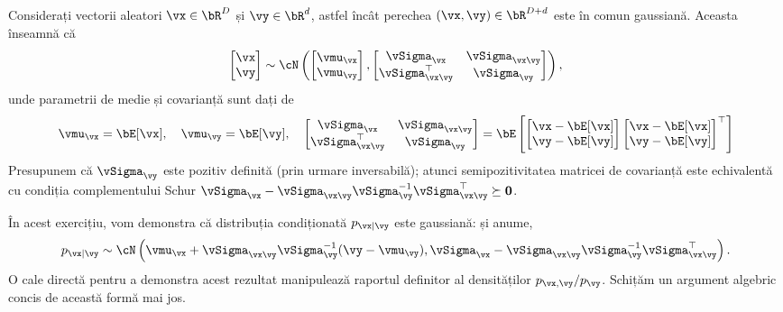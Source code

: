 \documentclass[../../book-main_ro.tex]{subfiles}
\begin{document}
\begin{exercise}\label{exercise:conditional_gaussian}
  Considerați vectorii aleatori $\vx \in \bR^D$ și $\vy \in \bR^d$, astfel încât perechea $(\vx, \vy) \in \bR^{D + d}$ este în comun gaussiană. Aceasta înseamnă că
  \begin{equation*}
    \begin{bmatrix}
      \vx \\
      \vy
    \end{bmatrix}
    \sim
    \cN \left(
      \begin{bmatrix}
        \vmu_{\vx} \\
        \vmu_{\vy}
      \end{bmatrix}
      ,
      \begin{bmatrix}
        \vSigma_{\vx} & \vSigma_{\vx\vy} \\
        \vSigma_{\vx\vy}^\top & \vSigma_{\vy}
      \end{bmatrix}
    \right),
  \end{equation*}
  unde parametrii de medie și covarianță sunt dați de
  \begin{equation*}
    \vmu_{\vx} = \bE[\vx],\quad \vmu_{\vy} = \bE[\vy],\quad
    \begin{bmatrix}
      \vSigma_{\vx} & \vSigma_{\vx\vy} \\
      \vSigma_{\vx\vy}^\top & \vSigma_{\vy}
    \end{bmatrix}
    =
    \bE\left[
      \begin{bmatrix}
        \vx - \bE[\vx] \\
        \vy - \bE[\vy]
      \end{bmatrix}
      \begin{bmatrix}
        \vx - \bE[\vx] \\
        \vy - \bE[\vy]
      \end{bmatrix}^\top
      \right]
  \end{equation*}
  Presupunem că $\vSigma_{\vy}$ este pozitiv definită (prin urmare inversabilă); atunci semipozitivitatea matricei de covarianță este echivalentă cu condiția complementului Schur $\vSigma_{\vx} - \vSigma_{\vx\vy} \vSigma_{\vy}^{-1} \vSigma_{\vx\vy}^\top \succeq \Zero$.

  În acest exercițiu, vom demonstra că distribuția condiționată $p_{\vx \mid \vy}$ este gaussiană: și anume,
  \begin{equation}\label{eq:gaussian-conditional-eqn}
    p_{\vx \mid \vy} \sim \cN\left(
      \vmu_{\vx} + \vSigma_{\vx\vy} \vSigma_{\vy}^{-1} (\vy - \vmu_{\vy}),
      \vSigma_{\vx} - \vSigma_{\vx\vy} \vSigma_{\vy}^{-1}
      \vSigma_{\vx\vy}^{\top}
    \right).
  \end{equation}
  O cale directă pentru a demonstra acest rezultat manipulează raportul definitor al densităților $p_{\vx, \vy} / p_{\vy}$. Schițăm un argument algebric concis de această formă mai jos.


\end{exercise}
\end{document}
